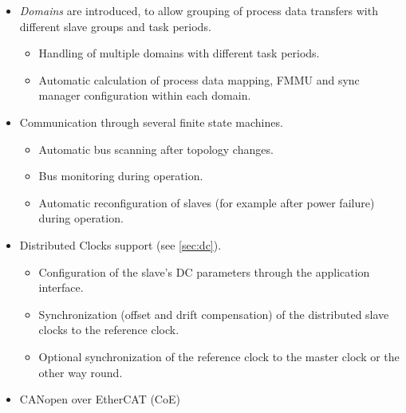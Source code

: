 \documentclass[a4paper,12pt,BCOR=6mm,bibtotoc,idxtotoc]{scrbook}
\begin{document}
\begin{itemize}
\item \textit{Domains} are introduced, to allow grouping of process
  data transfers with different slave groups and task periods.

  \begin{itemize}

  \item Handling of multiple domains with different task periods.

  \item Automatic calculation of process data mapping, FMMU and sync manager
  configuration within each domain.

  \end{itemize}

\item Communication through several finite state machines.

  \begin{itemize}

  \item Automatic bus scanning after topology changes.

  \item Bus monitoring during operation.

  \item Automatic reconfiguration of slaves (for example after power failure)
  during operation.

  \end{itemize}

\item Distributed Clocks support (see \autoref{sec:dc}).

  \begin{itemize}

  \item Configuration of the slave's DC parameters through the application
  interface.

  \item Synchronization (offset and drift compensation) of the distributed
  slave clocks to the reference clock.

  \item Optional synchronization of the reference clock to the master clock or
  the other way round.

  \end{itemize}

\item CANopen over EtherCAT (CoE)

  \begin{itemize}


\end{itemize}
\end{itemize}
\end{document}
